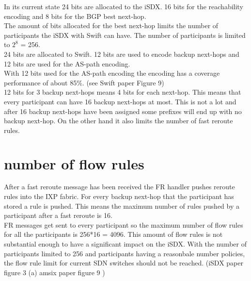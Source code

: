 In its current state 24 bits are allocated to the iSDX. 16 bits for the reachability encoding and 8 bits for the BGP best next-hop. \\
The amount of bits allocated for the best next-hop limits the number of participants the iSDX with Swift can have. The number of participants is limited to $2^8$ = 256. \\
24 bits are allocated to Swift. 12 bits are used to encode backup next-hops and 12 bits are used for the AS-path encoding. \\
With 12 bits used for the AS-path encoding the encoding has a coverage performance of about 85\%. (see Swift paper Figure 9)\\
12 bits for 3 backup next-hops means 4 bits for each next-hop. This means that every participant can have 16 backup next-hops at most. This is not a lot and after 16 backup next-hops have been assigned some prefixes will end up with no backup next-hop. On the other hand it also limits the number of fast reroute rules. 


\section{\label{chapter4:number of flow rules}number of flow rules}

After a fast reroute message has been received the FR handler pushes reroute rules into the IXP fabric. For every backup next-hop that the participant has stored a rule is pushed. This means the maximum number of rules pushed by a participant after a fast reroute is 16. \\
FR messages get sent to every participant so the maximum number of flow rules for all the participants is 256*16 = 4096. This amount of flow rules is not substantial enough to have a significant impact on the iSDX. With the number of participants limited to 256 and participants having a reasonbale number policies, the flow rule limit for current SDN switches should not be reached. (iSDX paper figure 3 (a) amsix paper figure 9 )\\
